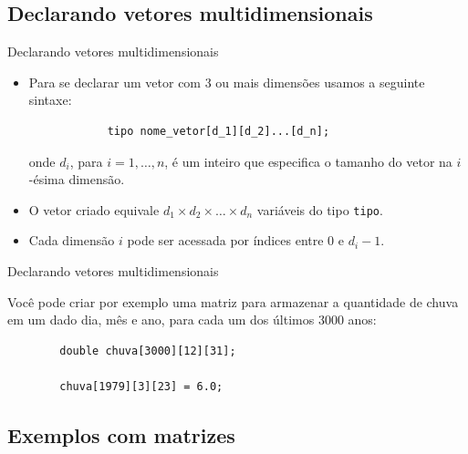 \documentclass[handout]{beamer}
\newcommand{\cod}[1]{\texttt{#1}}
\begin{document}

\subsection{Declarando vetores multidimensionais}

\begin{frame}[fragile]{Declarando vetores multidimensionais}

    \begin{itemize}
        \item Para se declarar um vetor com 3 ou mais dimensões usamos a seguinte sintaxe:
        \begin{verbatim}
            tipo nome_vetor[d_1][d_2]...[d_n];
        \end{verbatim}
        onde $d_i$, para $i=1,\ldots,n$, é um inteiro que especifica o tamanho do vetor na $i$-ésima dimensão.

        \item O vetor criado equivale $d_1 \times d_2 \times \dots \times d_n$ variáveis do tipo \cod{tipo}.

        \item Cada dimensão $i$ pode ser acessada por índices entre 0 e $d_i - 1$.
    \end{itemize}

\end{frame}

\begin{frame}[fragile]{Declarando vetores multidimensionais}

    Você pode criar por exemplo uma matriz para armazenar a quantidade de chuva em um dado dia, mês e ano, para cada um dos últimos 3000 anos:

    \begin{verbatim}
        double chuva[3000][12][31];

        chuva[1979][3][23] = 6.0;
    \end{verbatim}

\end{frame}


\subsection{Exemplos com matrizes}
\end{document}
